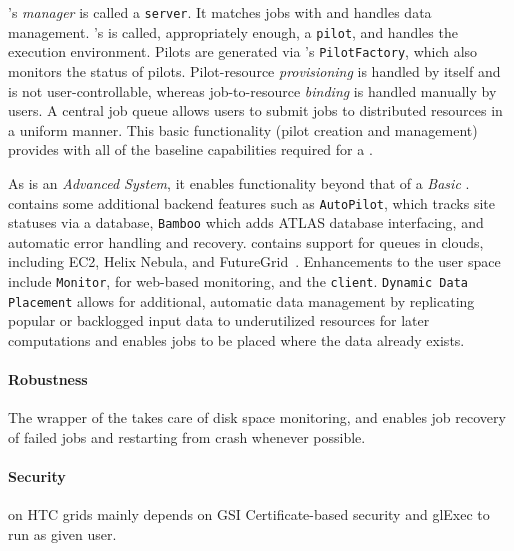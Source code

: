 \documentclass{sig-alternate}
\begin{document}
\panda's \textit{manager} is called a \texttt{\panda server}. It matches jobs
with \pilots and handles data management. \panda's \textit{\pilot} is called,
appropriately enough, a \texttt{pilot}, and handles the execution environment.
Pilots are generated via \panda's \texttt{PilotFactory}, which also monitors
the status of pilots. Pilot-resource \textit{provisioning} is handled by \panda
itself and is not user-controllable, whereas job-to-resource
\textit{binding} is handled manually by users. A central job queue allows users
to submit jobs to distributed resources in a uniform manner. This basic
functionality (pilot creation and management) provides \panda with all of the
baseline capabilities required for a \pilotjob.

As \panda is an \textit{Advanced \pilotjob System}, it enables functionality
beyond that of a \textit{Basic \pilotjob}. \panda contains some additional
backend features such as \texttt{AutoPilot}, which tracks site statuses via a
database, \texttt{Bamboo} which adds ATLAS database interfacing, and automatic
error handling and recovery. \panda contains support for queues in clouds,
including EC2, Helix Nebula, and
FutureGrid~\cite{pandapresentation2013-06}. Enhancements to
the user space include \texttt{Monitor}, for web-based monitoring, and the
\texttt{\panda client}.  \texttt{\panda Dynamic Data Placement}
\cite{maeno_pd2p:_2012} allows for additional, automatic data management by
replicating popular or backlogged input data to underutilized resources for
later computations and enables jobs to be placed where the data already exists.

\paragraph{Robustness}

The wrapper of the \pilot takes care of disk space monitoring, and enables job
recovery of failed jobs and restarting from crash whenever possible.

\paragraph{Security}

\panda on HTC grids mainly depends on GSI Certificate-based security and glExec
to run as given user.

\end{document}
